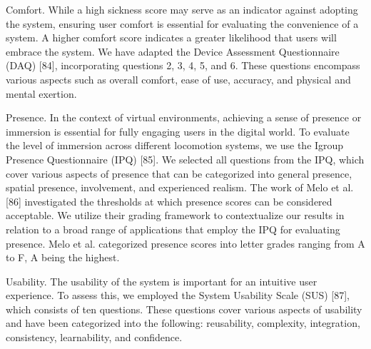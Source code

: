 \documentclass[preprint,12pt]{elsarticle}
\newcommand{\reftext}[1]{{\color{gray}#1}}   %
\begin{document}
\reftext{Comfort. While a high sickness score may serve as an indicator against adopting the system, ensuring user comfort is essential for evaluating the convenience of a system. A higher comfort score indicates a greater likelihood that users will embrace the system. We have adapted the Device Assessment Questionnaire (DAQ) [84], incorporating questions 2, 3, 4, 5, and 6. These questions encompass various aspects such as overall comfort, ease of use, accuracy, and physical and mental exertion.}

\reftext{Presence. In the context of virtual environments, achieving a sense of presence or immersion is essential for fully engaging users in the digital world. To evaluate the level of immersion across different locomotion systems, we use the Igroup Presence Questionnaire (IPQ) [85]. We selected all questions from the IPQ, which cover various aspects of presence that can be categorized into general presence, spatial presence, involvement, and experienced realism. The work of Melo et al. [86] investigated the thresholds at which presence scores can be considered acceptable. We utilize their grading framework to contextualize our results in relation to a broad range of applications that employ the IPQ for evaluating presence. Melo et al. categorized presence scores into letter grades ranging from A to F, A being the highest.}

\reftext{Usability. The usability of the system is important for an intuitive user experience. To assess this, we employed the System Usability Scale (SUS) [87], which consists of ten questions. These questions cover various aspects of usability and have been categorized into the following: reusability, complexity, integration, consistency, learnability, and confidence.}
\end{document}
